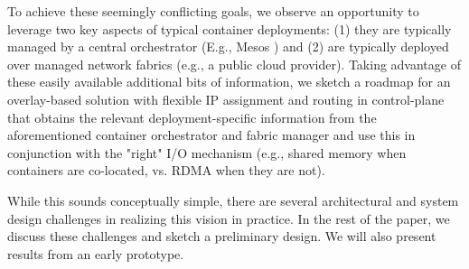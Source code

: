 To achieve these seemingly conflicting goals, we observe an opportunity to
leverage two key aspects of typical container deployments: (1) they are
typically managed by a central orchestrator (E.g., Mesos  \cite{mesos} ) and (2) are typically
deployed over managed network fabrics (e.g., a public cloud provider). Taking
advantage of these easily available additional bits of information, we sketch a
roadmap for an overlay-based solution  with flexible IP assignment and routing
in control-plane  that obtains the relevant
deployment-specific information from the aforementioned container orchestrator
and fabric manager and use this in conjunction with the "right" I/O mechanism
(e.g., shared memory when containers are co-located, vs. RDMA when they are
not). 

While this sounds conceptually simple, there are several architectural
and system design challenges in realizing this vision in practice. In the rest
of the paper, we discuss these challenges and sketch a preliminary design. We
will also present results from an early prototype.
